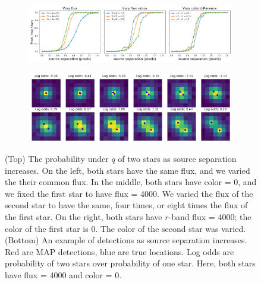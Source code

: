 \begin{figure}[!h]
    \centering
    \begin{subfigure}{0.95\textwidth}
        \includegraphics[width=\textwidth]{figures/deblending_test.png}
    \end{subfigure}
      \begin{subfigure}{0.95\textwidth}
        \includegraphics[width=\textwidth]{figures/deblending_ex_test.png}
    \end{subfigure}
    \label{eq:deblending_test}
    \caption{(Top) The probability under $q$ of two stars as source separation increases. On the left, both stars have the same flux, and we varied the their common flux. In the middle, both stars have color = 0, and we fixed the first star to have flux = 4000. We varied the flux of the second star to have the same, four times, or eight times the flux of the first star. On the right, both stars have $r$-band flux = 4000; the color of the first star is 0. The color of the second star was varied.
    (Bottom) An example of detections as source separation increases. Red are MAP detections, blue are true locations. Log odds are probability of two stars over probability of one star. Here, both stars have flux = 4000 and color = 0.}
    \label{fig:sparse_field}
\end{figure}
